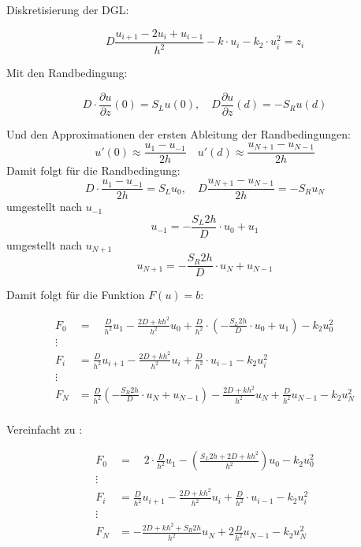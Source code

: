 Diskretisierung der DGL:

\begin{equation}
	D\frac{u_{i+1}-2u_i+u_{i-1}}{h^2}-k\cdot u_i-k_2 \cdot u_i^2=z_i
\end{equation}

Mit den Randbedingung:

\begin{equation}
	D\cdot \frac{\partial u}{\partial z}(0)=S_Lu(0),\quad D\frac{\partial u}{\partial z}(d)=-S_Ru(d)
\end{equation}

Und den Approximationen der ersten Ableitung der  Randbedingungen:
\begin{equation}
	u'(0)\approx \frac{u_1-u_{-1}}{2h} \quad u'(d)\approx \frac{u_{N+1}-u_{N-1}}{2h}
\end{equation}
Damit folgt für die Randbedingung:
\begin{equation}
	D\cdot \frac{u_1-u_{-1}}{2h}=S_Lu_0,\quad D\frac{u_{N+1}-u_{N-1}}{2h}=-S_Ru_N
\end{equation}
umgestellt nach $u_{-1}$
\begin{equation}
	u_{-1}=-\frac{S_L 2h}{D}\cdot u_0+u_1
\end{equation}
umgestellt nach $u_{N+1}$
\begin{equation}
	u_{N+1}=-\frac{S_R2h}{D}\cdot u_N+u_{N-1}
\end{equation}



Damit folgt für die Funktion $F(u)=b$:

\begin{align*}
	F_0&= \quad \frac{D}{h^2}u_1-\frac{2D+kh^2}{h^2}u_0+\frac{D}{h^2}\cdot\left( -\frac{S_L 2h}{D}\cdot u_0+u_1\right) -k_2u_0^2\\
	\vdots \\
	F_i&= 	\frac{D}{h^2}u_{i+1}-\frac{2D+kh^2}{h^2}u_i+\frac{D}{h^2}\cdot u_{i-1} -k_2u_i^2\\
	\vdots \\
	F_N &= \frac{D}{h^2}\left( -\frac{S_R2h}{D}\cdot u_N+u_{N-1}\right) -\frac{2D+kh^2}{h^2}u_N+\frac{D}{h^2} u_{N-1}-k_2u^2_N\\
\end{align*}


Vereinfacht zu :

\begin{align*}
	F_0&= \quad 2\cdot \frac{D}{h^2}u_1-\left( \frac{S_L2h+2D+kh^2}{h^2}\right) u_0 -k_2u_0^2\\
	\vdots \\
	F_i&= 	\frac{D}{h^2}u_{i+1}-\frac{2D+kh^2}{h^2}u_i+\frac{D}{h^2}\cdot u_{i-1} -k_2u_i^2\\
	\vdots \\
	F_N &= -\frac{2D+kh^2+S_R2h}{h^2}u_N+2\frac{D}{h^2}u_{N-1}-k_2u^2_N\\
\end{align*}



